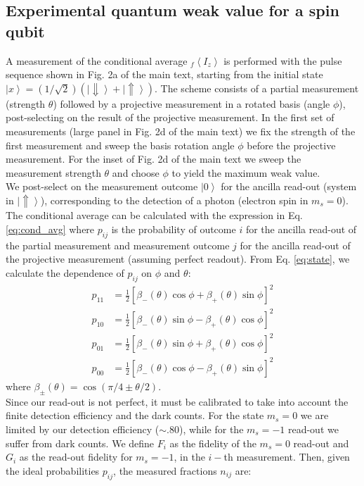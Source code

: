 \documentclass[12pt]{article}
\def\ket#1{\left|#1\right>}
\begin{document}
\subsection {Experimental quantum weak value for a spin qubit}
A measurement of the conditional average $ _f \left \langle I_z \right \rangle$ is performed with the pulse sequence shown in Fig. 2a of the main text, starting from the initial state $\ket{x} = (1/\sqrt{2}) \left( \ket{\Downarrow} + \ket{\Uparrow} \right)$. The scheme consists of a partial measurement (strength $\theta$) followed by a projective measurement in a rotated basis (angle $\phi$), post-selecting on the result of the projective measurement. In the first set of measurements (large panel in Fig. 2d of the main text) we fix the strength of the first measurement and sweep the basis rotation angle $\phi$ before the projective measurement. For the inset of Fig. 2d of the main text we sweep the measurement strength $\theta$ and choose $\phi$ to yield the maximum weak value. \\
We post-select on the measurement outcome $\ket{0}$ for the ancilla read-out (system in $\ket{\Uparrow}$), corresponding to the detection of a photon (electron spin in $m_s=0$). \\
The conditional average can be calculated with the expression in Eq. \ref {eq:cond_avg} where $p_{ij}$ is the probability of outcome $i$ for the ancilla read-out of the partial measurement and measurement outcome $j$ for the ancilla read-out of the projective measurement (assuming perfect readout). From Eq. \ref{eq:state}, we calculate the dependence of $p_{ij}$ on $\phi$ and $\theta$:
\begin{equation}
\label{eq:prob_wm}
  \begin{split}
  p_{11}&=\frac{1}{2} \left[ \beta_-(\theta) \cos\phi + \beta_+ (\theta) \sin\phi \right]^2  \\
  p_{10}&= \frac{1}{2} \left[ \beta_-(\theta) \sin\phi - \beta_+ (\theta) \cos\phi\right]^2 \\
  p_{01}&= \frac{1}{2} \left[ \beta_-(\theta) \sin\phi + \beta_+ (\theta) \cos\phi\right]^2 \\
  p_{00}&=\frac{1}{2} \left[ \beta_-(\theta) \cos\phi - \beta_+ (\theta) \sin\phi \right]^2 
  \end{split}
\end{equation}
where $\beta_{\pm} (\theta) = \cos (\pi/4 \pm \theta/2)$.\\
 
Since our read-out is not perfect, it must be calibrated to take into account the finite detection efficiency and the dark counts. For the state $m_s=0$ we are limited by our detection efficiency ($\sim .80$), while for the $m_s=-1$ read-out we suffer from dark counts. We define $F_i$ as the fidelity of the $m_s=0$ read-out and $G_i$ as the read-out fidelity for $m_s=-1$, in the $i-$th measurement.
Then, given the ideal probabilities $p_{ij}$, the measured fractions $n_{ij}$ are:
 
\end{document}
